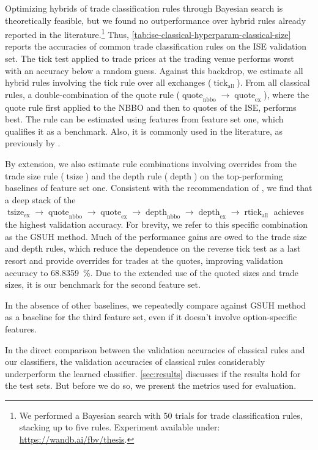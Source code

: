 Optimizing hybrids of trade classification rules through Bayesian search is theoretically feasible, but we found no outperformance over hybrid rules already reported in the literature.\footnote{We performed a Bayesian search with $50$ trials for trade classification rules, stacking up to five rules. Experiment available under: \url{https://wandb.ai/fbv/thesis}.} Thus, \cref{tab:ise-classical-hyperparam-classical-size} reports the accuracies of common trade classification rules on the \gls{ISE} validation set. The tick test applied to trade prices at the trading venue performs worst with an accuracy below a random guess. Against this backdrop, we estimate all hybrid rules involving the tick rule over all exchanges ($\operatorname{tick}_{\mathrm{all}}$). From all classical rules, a double-combination of the quote rule ($\operatorname{quote}_{\mathrm{nbbo}} \to \operatorname{quote}_{\mathrm{ex}}$), where the quote rule first applied to the \gls{NBBO} and then to quotes of the \gls{ISE}, performs best. The rule can be estimated using features from feature set one, which qualifies it as a benchmark. Also, it is commonly used in the literature, as previously by \textcite[][]{muravyevOptionsTradingCosts2020}.

By extension, we also estimate rule combinations involving overrides from the trade size rule ($\operatorname{tsize}$) and the depth rule ($\operatorname{depth}$) on the top-performing baselines of feature set one. Consistent with the recommendation of \textcite[][14]{grauerOptionTradeClassification2022}, we find that a deep stack of the $\operatorname{tsize}_{\mathrm{ex}} \to \operatorname{quote}_{\mathrm{nbbo}} \to \operatorname{quote}_{\mathrm{ex}} \to \operatorname{depth}_{\mathrm{nbbo}} \to \operatorname{depth}_{\mathrm{ex}} \to \operatorname{rtick}_{\mathrm{all}}$ achieves the highest validation accuracy. For brevity, we refer to this specific combination as the \gls{GSUH} method. Much of the performance gains are owed to the trade size and depth rules, which reduce the dependence on the reverse tick test as a last resort and provide overrides for trades at the quotes, improving validation accuracy to \SI{68.8359}{\percent}. Due to the extended use of the quoted sizes and trade sizes, it is our benchmark for the second feature set.

In the absence of other baselines, we repeatedly compare against \gls{GSUH} method as a baseline for the third feature set, even if it doesn't involve option-specific features.

In the direct comparison between the validation accuracies of classical rules and our classifiers, the validation accuracies of classical rules considerably underperform the learned classifier. \cref{sec:results} discusses if the results hold for the test sets. But before we do so, we present the metrics used
for evaluation.

